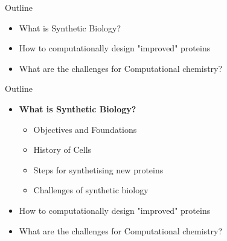 

 
\begin{frame}{Outline}
\footnotesize
\begin{itemize}
\item What is Synthetic Biology?
\item How to computationally design "improved" proteins
\item What are the challenges for Computational chemistry?
\end{itemize}
\end{frame}


\begin{frame}{Outline}
\footnotesize

\begin{itemize}
\item \textbf{What is Synthetic Biology?}
\begin{itemize}
\item Objectives and Foundations
\item History of Cells
\item Steps for synthetising new proteins 
\item Challenges of synthetic biology
\end{itemize}
\item How to computationally design "improved" proteins
\item What are the challenges for Computational chemistry?
\end{itemize}
\end{frame}

